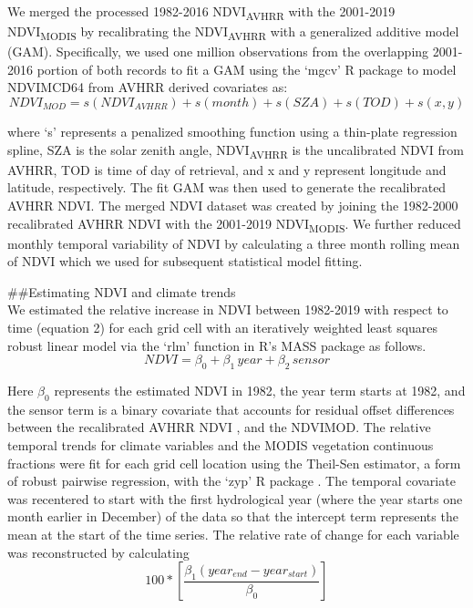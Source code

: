 \documentclass[gc, manuscript]{copernicus}
\begin{document}
We merged the processed 1982-2016 NDVI\textsubscript{AVHRR} with the
2001-2019 NDVI\textsubscript{MODIS} by recalibrating the
NDVI\textsubscript{AVHRR} with a generalized additive model (GAM).
Specifically, we used one million observations from the overlapping
2001-2016 portion of both records to fit a GAM using the `mgcv' R
package \citep{woodGeneralizedAdditiveModels2017b} to model NDVIMCD64
from AVHRR derived covariates as: \begin{equation}
NDVI_{MOD} = s(NDVI_{AVHRR})+s(month) + s(SZA) + s(TOD) + s(x,y)
\end{equation}

where `s' represents a penalized smoothing function using a thin-plate
regression spline, SZA is the solar zenith angle,
NDVI\textsubscript{AVHRR} is the uncalibrated NDVI from AVHRR, TOD is
time of day of retrieval, and x and y represent longitude and latitude,
respectively. The fit GAM was then used to generate the recalibrated
AVHRR NDVI. The merged NDVI dataset was created by joining the 1982-2000
recalibrated AVHRR NDVI with the 2001-2019 NDVI\textsubscript{MODIS}. We
further reduced monthly temporal variability of NDVI by calculating a
three month rolling mean of NDVI which we used for subsequent
statistical model fitting.

\#\#Estimating NDVI and climate trends\\
We estimated the relative increase in NDVI between 1982-2019 with
respect to time (equation 2) for each grid cell with an iteratively
weighted least squares robust linear model via the `rlm' function in R's
MASS package \citep{venablesModernAppliedStatistics2002} as follows.
\begin{equation}
NDVI=\beta_0+ \beta_1\,year+\beta_2\,sensor
\end{equation}

Here \(\beta_0\) represents the estimated NDVI in 1982, the year term
starts at 1982, and the sensor term is a binary covariate that accounts
for residual offset differences between the recalibrated AVHRR NDVI ,
and the NDVIMOD. The relative temporal trends for climate variables and
the MODIS vegetation continuous fractions were fit for each grid cell
location using the Theil-Sen estimator, a form of robust pairwise
regression, with the `zyp' R package
\citep{bronaughZypZhangYuePilon2019}. The temporal covariate was
recentered to start with the first hydrological year (where the year
starts one month earlier in December) of the data so that the intercept
term represents the mean at the start of the time series. The relative
rate of change for each variable was reconstructed by calculating
\begin{equation}
100*[\frac{\beta_1(year_{end}-year_{start})}{\beta_0}]
\end{equation}
\end{document}
